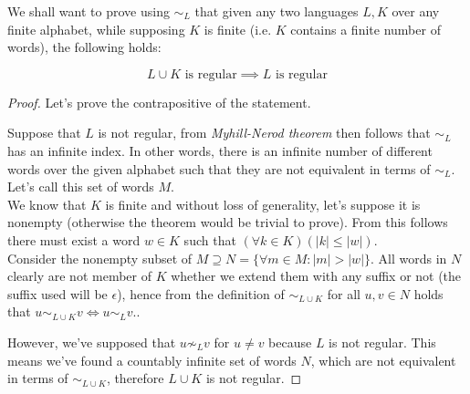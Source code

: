 \documentclass{article}
\title{}
\author{Adam Fiedler}
\begin{document}
\maketitle

We shall want to prove using $\sim_L$ that given any two languages $L, K$ over any finite alphabet, while supposing $K$ is finite (i.e. $K$ contains a finite number of words), the following holds:

\[L \cup K \text{ is regular} \implies L \text{ is regular}\]

\begin{proof}

Let's prove the contrapositive of the statement.

Suppose that $L$ is not regular, from \emph{Myhill-Nerod theorem} then follows that $\sim_L$ has an infinite index. In other words, there is an infinite number of different words over the given alphabet such that they are not equivalent in terms of $\sim_L$. Let's call this set of words $M$.\\

We know that $K$ is finite and without loss of generality, let's suppose it is nonempty (otherwise the theorem would be trivial to prove). From this follows there must exist a word $w \in K$ such that $(\forall k \in K)(|k| \leq |w|)$.\\ 

Consider the nonempty subset of $M \supseteq N = \{\forall m \in M: |m| > |w|\}$. All words in $N$ clearly are not member of $K$ whether we extend them with any suffix or not (the suffix used will be $\epsilon$), hence from the definition of $\sim_{L \cup K}$ for all $u, v \in N$ holds that $u \sim_{L \cup K} v \iff u \sim_{L} v$.\newline.

However, we've supposed that $u \not\sim_L v$ for $u \neq v$ because $L$ is not regular. This means we've found a countably infinite set of words $N$, which are not equivalent in terms of $\sim_{L \cup K}$, therefore $L \cup K$ is not regular.

\end{proof}
\end{document}
